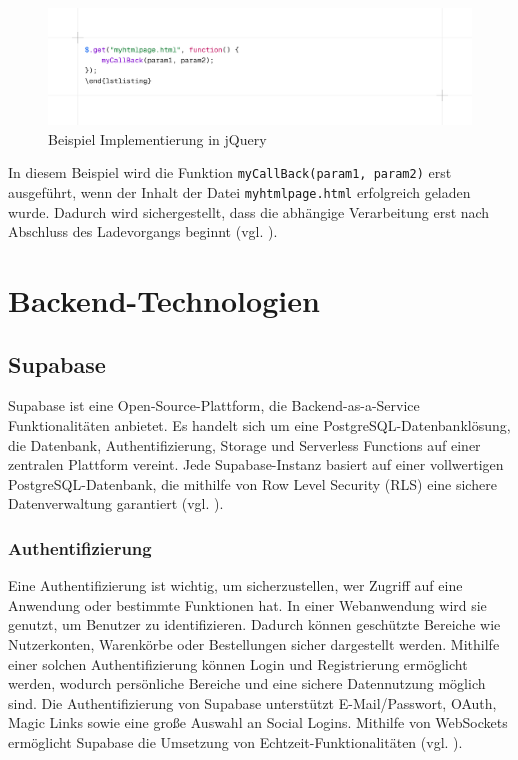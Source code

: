 \documentclass[oneside]{ausarbeitung}
\begin{document}
\begin{figure}[H] %
    \centering
    \includegraphics[width=\linewidth]{images/jqbeispiel.png}
    \caption{Beispiel Implementierung in jQuery}
    \label{fig:bspjq}
\end{figure}

In diesem Beispiel wird die Funktion \texttt{myCallBack(param1, param2)} erst ausgeführt, wenn der Inhalt der Datei \texttt{myhtmlpage.html} erfolgreich geladen wurde. Dadurch wird sichergestellt, dass die abhängige Verarbeitung erst nach Abschluss des Ladevorgangs beginnt (vgl. \parencite{jquery_api}).  

\section{Backend-Technologien}
\subsection{Supabase}

Supabase ist eine Open-Source-Plattform, die Backend-as-a-Service Funktionalitäten anbietet. Es handelt sich um eine PostgreSQL-Datenbanklösung, die Datenbank, Authentifizierung, Storage und Serverless Functions auf einer zentralen Plattform vereint. Jede Supabase-Instanz basiert auf einer vollwertigen PostgreSQL-Datenbank, die mithilfe von Row Level Security (RLS) eine sichere Datenverwaltung garantiert (vgl. \parencite{supabase}).

\subsubsection{Authentifizierung}
Eine Authentifizierung ist wichtig, um sicherzustellen, wer Zugriff auf eine Anwendung oder bestimmte Funktionen hat. In einer Webanwendung wird sie genutzt, um Benutzer zu identifizieren. Dadurch können geschützte Bereiche wie Nutzerkonten, Warenkörbe oder Bestellungen sicher dargestellt werden. Mithilfe einer solchen Authentifizierung können Login und Registrierung ermöglicht werden, wodurch persönliche Bereiche und eine sichere Datennutzung möglich sind.
Die Authentifizierung von Supabase unterstützt E-Mail/Passwort, OAuth, Magic Links sowie eine große Auswahl an Social Logins. Mithilfe von WebSockets ermöglicht Supabase die Umsetzung von Echtzeit-Funktionalitäten (vgl. \parencite{supabase}).
\end{document}

